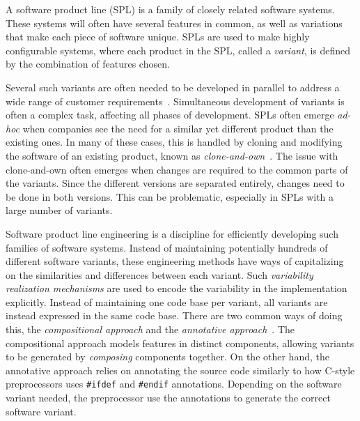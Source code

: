 \documentclass[a4paper,english]{ifimaster}
\begin{document}
A software product line (SPL) is a family of closely related software systems. These systems will often have several features in common, as well as variations that make each piece of software unique. SPLs are used to make highly configurable systems, where each product in the SPL, called a \textit{variant}, is defined by the combination of features chosen.


Several such variants are often needed to be developed in parallel to address a wide range of customer requirements~\cite{cite:software_diversity_ina}. Simultaneous development of variants is often a complex task, affecting all phases of development. SPLs often emerge \textit{ad-hoc} when companies see the need for a similar yet different product than the existing ones. In many of these cases, this is handled by cloning and modifying the software of an existing product, known as \textit{clone-and-own}~\cite{cite:clone_and_own}. The issue with clone-and-own often emerges when changes are required to the common parts of the variants. Since the different versions are separated entirely, changes need to be done in both versions. This can be problematic, especially in SPLs with a large number of variants.

Software product line engineering is a discipline for efficiently developing such families of software systems. Instead of maintaining potentially hundreds of different software variants, these engineering methods have ways of capitalizing on the similarities and differences between each variant. Such \textit{variability realization mechanisms} are used to encode the variability in the implementation explicitly. Instead of maintaining one code base per variant, all variants are instead expressed in the same code base. There are two common ways of doing this, the \textit{compositional approach} and the \textit{annotative approach}~\cite{cite:granularity_in_spl}. The compositional approach models features in distinct components, allowing variants to be generated by \textit{composing} components together. On the other hand, the annotative approach relies on annotating the source code similarly to how C-style preprocessors uses \texttt{\#ifdef} and \texttt{\#endif} annotations. Depending on the software variant needed, the preprocessor use the annotations to generate the correct software variant.
\end{document}
